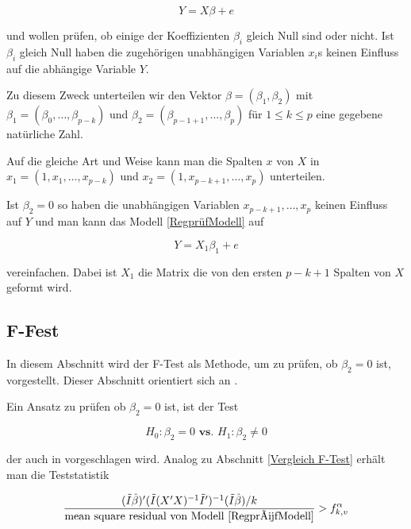 \documentclass[12pt,a4paper]{article}
\theoremstyle{definition}
\theoremstyle{definition}
\theoremstyle{definition}
\theoremstyle{definition}
\begin{document}
\begin{equation} \label{RegprüfModell}
Y=X \beta + e
\end{equation}

und wollen prüfen, ob einige der Koeffizienten $\beta_i$ gleich Null sind oder nicht. Ist $\beta_i$ gleich Null haben die zugehörigen unabhängigen Variablen $x_i$s keinen Einfluss auf die abhängige Variable $Y$. 

Zu diesem Zweck unterteilen wir den Vektor $\beta=(\beta_1,\beta_2)$ mit $\beta_1=(\beta_0, \ldots, \beta_{p-k})$ und $\beta_2=(\beta_{p-1+1}, \ldots, \beta_{p})$ für $1 \leq k \leq p$ eine gegebene natürliche Zahl. 

Auf die gleiche Art und Weise kann man die Spalten $x$ von $X$ in $x_1=(1,x_1, \ldots, x_{p-k})$ und $x_2=(1,x_{p-k+1}, \ldots, x_{p})$ unterteilen.

Ist $\beta_2=0$ so haben die unabhängigen Variablen $x_{p-k+1}, \ldots, x_p$ keinen Einfluss auf $Y$ und man kann das Modell \ref{RegprüfModell} auf 

\begin{equation}
Y=X_1 \beta_1 + e
\end{equation}

vereinfachen. Dabei ist $X_1$ die Matrix die von den ersten $p-k+1$ Spalten von $X$ geformt wird.

\subsection{F-Fest}
\label{F-Test-Teil}
In diesem Abschnitt wird der F-Test als Methode, um zu prüfen, ob $\beta_2=0$ ist, vorgestellt. Dieser Abschnitt orientiert sich an \cite[100-102]{Liu64}.

Ein Ansatz zu prüfen ob $\beta_2=0$ ist, ist der Test 

\begin{equation} \label{Test_prüfen}
H_{0} : \beta_{2} = 0  \textbf{ vs. }  H_{1} : \beta_{2} \neq 0
\end{equation}

der auch in \cite{Draper98} vorgeschlagen wird. Analog zu Abschnitt \ref{Vergleich F-Test} erhält man die Teststatistik

\begin{equation*}
\frac{(\tilde{I}\hat{\beta})'(\tilde{I}(X'X)^{-1}\tilde{I}')^{-1}(\tilde{I}\hat{\beta})/k}{\text{mean square residual von Modell \ref{RegprüfModell}}} > f^{\alpha}_{k,v}
\end{equation*}
\end{document}
